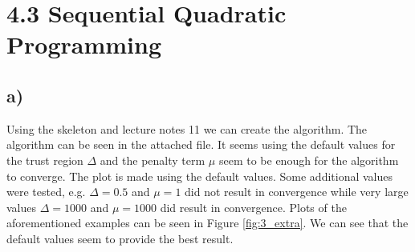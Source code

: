 \documentclass{article}
\begin{document}
\section*{4.3 Sequential Quadratic Programming}
	\subsection*{a)}
	Using the skeleton and lecture notes 11 we can create the algorithm. The algorithm can be seen in the attached file. It seems using the default values for the trust region $\Delta$ and the penalty term $\mu$ seem to be enough for the algorithm to converge. The plot is made using the default values. Some additional values were tested, e.g. $\Delta=0.5$ and $\mu=1$ did not result in convergence while very large values $\Delta=1000$ and $\mu=1000$ did result in convergence. Plots of the aforementioned examples can be seen in Figure \ref{fig:3_extra}. We can see that the default values seem to provide the best result.
\end{document}
